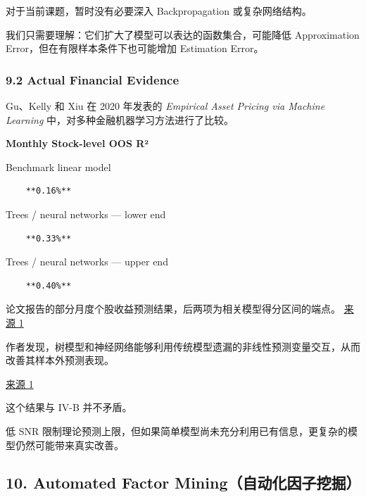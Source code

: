 对于当前课题，暂时没有必要深入 Backpropagation 或复杂网络结构。

我们只需要理解：它们扩大了模型可以表达的函数集合，可能降低 Approximation Error，但在有限样本条件下也可能增加 Estimation Error。

\hypertarget{part-4-63-0001-actual-financial-evidence}{%
\subsubsection{9.2 Actual Financial Evidence}\label{part-4-63-0001-actual-financial-evidence}}

Gu、Kelly 和 Xiu 在 2020 年发表的 \emph{Empirical Asset Pricing via Machine Learning} 中，对多种金融机器学习方法进行了比较。

\textbf{Monthly Stock-level OOS R²}

Benchmark linear model

\begin{verbatim}
    **0.16%**
\end{verbatim}

Trees / neural networks --- lower end

\begin{verbatim}
    **0.33%**
\end{verbatim}

Trees / neural networks --- upper end

\begin{verbatim}
    **0.40%**
\end{verbatim}

论文报告的部分月度个股收益预测结果，后两项为相关模型得分区间的端点。 \href{https://doi.org/10.1093/rfs/hhaa009}{来源 1}

作者发现，树模型和神经网络能够利用传统模型遗漏的非线性预测变量交互，从而改善其样本外预测表现。

\href{https://www.nber.org/papers/w25398}{来源 1}

这个结果与 IV-B 并不矛盾。

低 SNR 限制理论预测上限，但如果简单模型尚未充分利用已有信息，更复杂的模型仍然可能带来真实改善。

\hypertarget{part-4-63-0001-automated-factor-miningux81eaux52a8ux5316ux56e0ux5b50ux6316ux6398}{%
\subsection{10. Automated Factor Mining（自动化因子挖掘）}\label{part-4-63-0001-automated-factor-miningux81eaux52a8ux5316ux56e0ux5b50ux6316ux6398}}

